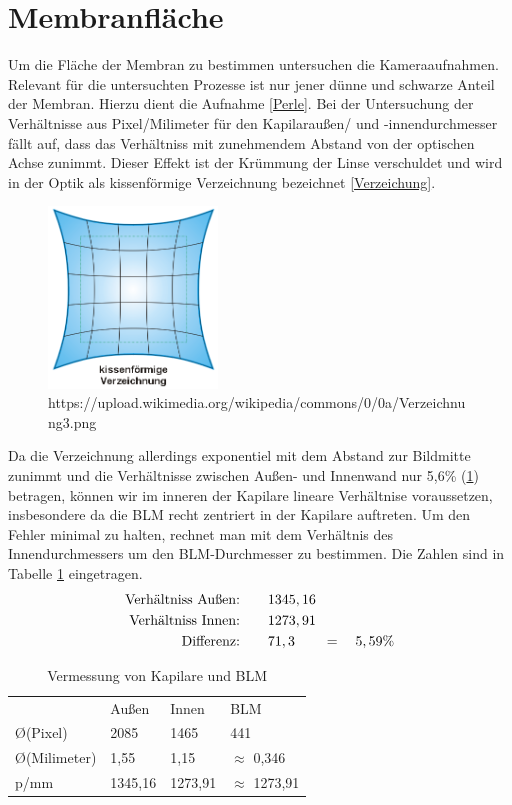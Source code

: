 \documentclass{include/thesisclass3}
\begin{document}
\section{Membranfläche}
Um die Fläche der Membran zu bestimmen untersuchen die Kameraaufnahmen. Relevant für die untersuchten Prozesse ist nur jener dünne und schwarze Anteil der Membran. Hierzu dient die Aufnahme \ref{Perle}. Bei der Untersuchung der Verhältnisse aus Pixel/Milimeter für den Kapilaraußen/ und -innendurchmesser fällt auf, dass das Verhältniss mit zunehmendem Abstand von der optischen Achse zunimmt. Dieser Effekt ist der Krümmung der Linse verschuldet und wird in der Optik als kissenförmige Verzeichnung bezeichnet \ref{Verzeichung}.
\begin{figure}[ht]
	\begin{center}
		\includegraphics[width=0.4\textwidth]{images/Verzeichnung.png}
		\caption{https://upload.wikimedia.org/wikipedia/commons/0/0a/Verzeichnung3.png}
		\label{Verzeichnung}
	\end{center}
\end{figure}
Da die Verzeichnung allerdings exponentiel mit dem Abstand zur Bildmitte zunimmt und die Verhältnisse zwischen Außen- und Innenwand nur 5,6\% (\ref{tab-ratio}) betragen, können wir im inneren der Kapilare lineare Verhältnise voraussetzen, insbesondere da die BLM recht zentriert in der Kapilare auftreten.
Um den Fehler minimal zu halten, rechnet man mit dem Verhältnis des Innendurchmessers um den BLM-Durchmesser zu bestimmen. Die Zahlen sind in Tabelle \ref{tab-ratio} eingetragen.
\begin{align*}
	\text{Verhältniss Au\ss en:\qquad} &1345,16\\
	\text{Verhältniss Innen:\qquad} &1273,91\\
	\text{Differenz:\qquad} & 71,3 \qquad= \quad 5,59\%
\end{align*}
\begin{table}[]
	\centering
	\caption{Vermessung von Kapilare und BLM}
	\label{tab-ratio}
	\begin{tabular}{llll}
		& Au\ss en   & Innen     & BLM     \\
		\O  (Pixel) & 2085    & 1465    & 441     \\
		\O  (Milimeter)       & 1,55    & 1,15    & $\approx$ 0,346   \\
		p/mm            & 1345,16 & 1273,91 & $\approx$ 1273,91
	\end{tabular}
\end{table}
\end{document}
